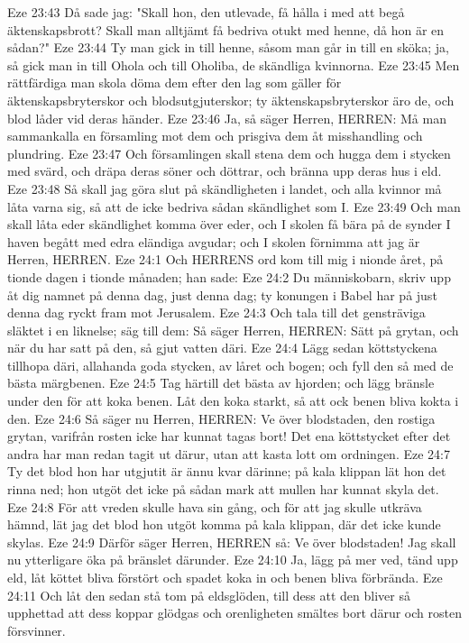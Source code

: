 Eze 23:43  Då sade jag: "Skall hon, den utlevade, få hålla i med att begå äktenskapsbrott? Skall man alltjämt få bedriva otukt med henne, då hon är en sådan?"
Eze 23:44  Ty man gick in till henne, såsom man går in till en sköka; ja, så gick man in till Ohola och till Oholiba, de skändliga kvinnorna.
Eze 23:45  Men rättfärdiga man skola döma dem efter den lag som gäller för äktenskapsbryterskor och blodsutgjuterskor; ty äktenskapsbryterskor äro de, och blod låder vid deras händer.
Eze 23:46  Ja, så säger Herren, HERREN: Må man sammankalla en församling mot dem och prisgiva dem åt misshandling och plundring.
Eze 23:47  Och församlingen skall stena dem och hugga dem i stycken med svärd, och dräpa deras söner och döttrar, och bränna upp deras hus i eld.
Eze 23:48  Så skall jag göra slut på skändligheten i landet, och alla kvinnor må låta varna sig, så att de icke bedriva sådan skändlighet som I.
Eze 23:49  Och man skall låta eder skändlighet komma över eder, och I skolen få bära på de synder I haven begått med edra eländiga avgudar; och I skolen förnimma att jag är Herren, HERREN.
Eze 24:1  Och HERRENS ord kom till mig i nionde året, på tionde dagen i tionde månaden; han sade:
Eze 24:2  Du människobarn, skriv upp åt dig namnet på denna dag, just denna dag; ty konungen i Babel har på just denna dag ryckt fram mot Jerusalem.
Eze 24:3  Och tala till det gensträviga släktet i en liknelse; säg till dem: Så säger Herren, HERREN: Sätt på grytan, och när du har satt på den, så gjut vatten däri.
Eze 24:4  Lägg sedan köttstyckena tillhopa däri, allahanda goda stycken, av låret och bogen; och fyll den så med de bästa märgbenen.
Eze 24:5  Tag härtill det bästa av hjorden; och lägg bränsle under den för att koka benen. Låt den koka starkt, så att ock benen bliva kokta i den.
Eze 24:6  Så säger nu Herren, HERREN: Ve över blodstaden, den rostiga grytan, varifrån rosten icke har kunnat tagas bort! Det ena köttstycket efter det andra har man redan tagit ut därur, utan att kasta lott om ordningen.
Eze 24:7  Ty det blod hon har utgjutit är ännu kvar därinne; på kala klippan lät hon det rinna ned; hon utgöt det icke på sådan mark att mullen har kunnat skyla det.
Eze 24:8  För att vreden skulle hava sin gång, och för att jag skulle utkräva hämnd, lät jag det blod hon utgöt komma på kala klippan, där det icke kunde skylas.
Eze 24:9  Därför säger Herren, HERREN så: Ve över blodstaden! Jag skall nu ytterligare öka på bränslet därunder.
Eze 24:10  Ja, lägg på mer ved, tänd upp eld, låt köttet bliva förstört och spadet koka in och benen bliva förbrända.
Eze 24:11  Och låt den sedan stå tom på eldsglöden, till dess att den bliver så upphettad att dess koppar glödgas och orenligheten smältes bort därur och rosten försvinner.
